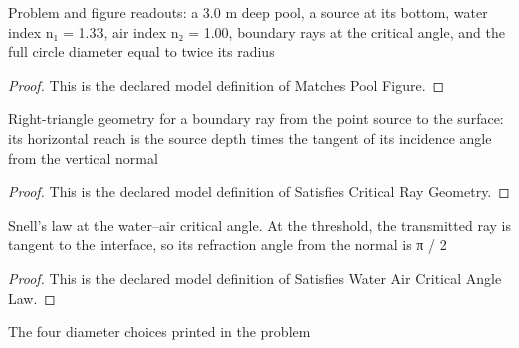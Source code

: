 \begin{definition}
  \label{def:physics:phyx-mini-0051:phyxminiproblems-problemphyxmini0051-matchespoolfigure}
  Problem and figure readouts: a 3.0 m deep pool, a source at its bottom, water index n₁ = 1.33, air index n₂ = 1.00, boundary rays at the critical angle, and the full circle diameter equal to twice its radius
\end{definition}
\begin{proof}
  This is the declared model definition of Matches Pool Figure.
\end{proof}
\begin{definition}
  \label{def:physics:phyx-mini-0051:phyxminiproblems-problemphyxmini0051-satisfiescriticalraygeometry}
  Right-triangle geometry for a boundary ray from the point source to the surface: its horizontal reach is the source depth times the tangent of its incidence angle from the vertical normal
\end{definition}
\begin{proof}
  This is the declared model definition of Satisfies Critical Ray Geometry.
\end{proof}
\begin{definition}
  \label{def:physics:phyx-mini-0051:phyxminiproblems-problemphyxmini0051-satisfieswateraircriticalanglelaw}
  Snell's law at the water--air critical angle. At the threshold, the transmitted ray is tangent to the interface, so its refraction angle from the normal is π / 2
\end{definition}
\begin{proof}
  This is the declared model definition of Satisfies Water Air Critical Angle Law.
\end{proof}
\begin{definition}
  \label{def:physics:phyx-mini-0051:phyxminiproblems-problemphyxmini0051-answerchoice}
  The four diameter choices printed in the problem
\end{definition}
